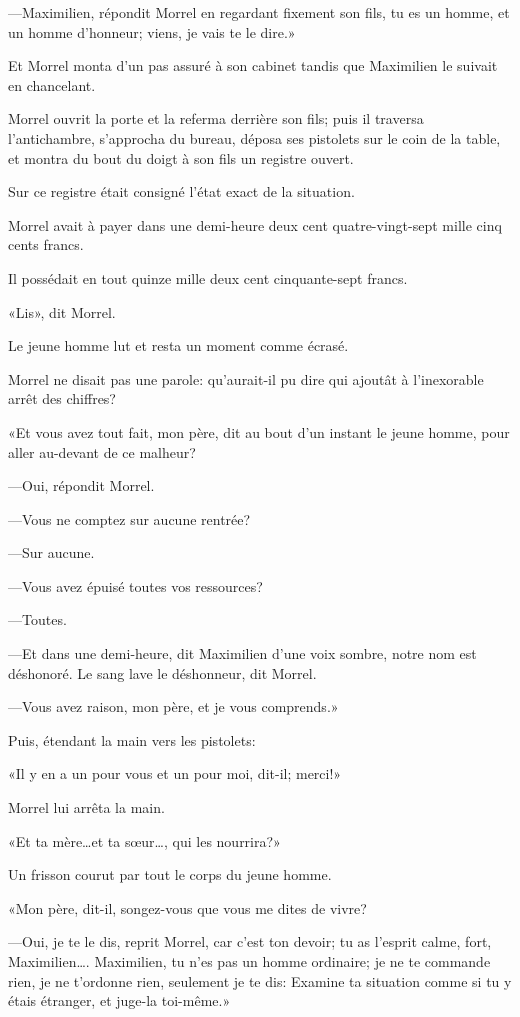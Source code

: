 —Maximilien, répondit Morrel en regardant fixement son fils, tu es un homme, et un homme d'honneur; viens, je vais te le dire.»

Et Morrel monta d'un pas assuré à son cabinet tandis que Maximilien le suivait en chancelant.

Morrel ouvrit la porte et la referma derrière son fils; puis il traversa l'antichambre, s'approcha du bureau, déposa ses pistolets sur le coin de la table, et montra du bout du doigt à son fils un registre ouvert.

Sur ce registre était consigné l'état exact de la situation.

Morrel avait à payer dans une demi-heure deux cent quatre-vingt-sept mille cinq cents francs.

Il possédait en tout quinze mille deux cent cinquante-sept francs.

«Lis», dit Morrel.

Le jeune homme lut et resta un moment comme écrasé.

Morrel ne disait pas une parole: qu'aurait-il pu dire qui ajoutât à l'inexorable arrêt des chiffres?

«Et vous avez tout fait, mon père, dit au bout d'un instant le jeune homme, pour aller au-devant de ce malheur?

—Oui, répondit Morrel.

—Vous ne comptez sur aucune rentrée?

—Sur aucune.

—Vous avez épuisé toutes vos ressources?

—Toutes.

—Et dans une demi-heure, dit Maximilien d'une voix sombre, notre nom est déshonoré. Le sang lave le déshonneur, dit Morrel.

—Vous avez raison, mon père, et je vous comprends.»

Puis, étendant la main vers les pistolets:

«Il y en a un pour vous et un pour moi, dit-il; merci!»

Morrel lui arrêta la main.

«Et ta mère\dots et ta sœur\dots, qui les nourrira?»

Un frisson courut par tout le corps du jeune homme.

«Mon père, dit-il, songez-vous que vous me dites de vivre?

—Oui, je te le dis, reprit Morrel, car c'est ton devoir; tu as l'esprit calme, fort, Maximilien\dots. Maximilien, tu n'es pas un homme ordinaire; je ne te commande rien, je ne t'ordonne rien, seulement je te dis: Examine ta situation comme si tu y étais étranger, et juge-la toi-même.»

